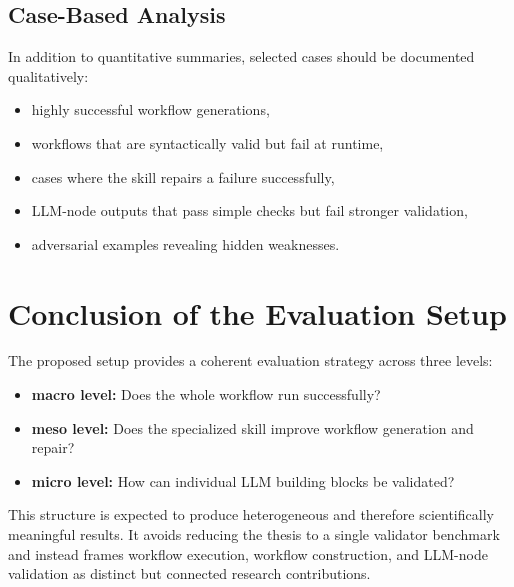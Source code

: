 \documentclass[12pt,a4paper]{article}
\begin{document}
\subsection{Case-Based Analysis}

In addition to quantitative summaries, selected cases should be documented qualitatively:

\begin{itemize}
  \item highly successful workflow generations,
  \item workflows that are syntactically valid but fail at runtime,
  \item cases where the skill repairs a failure successfully,
  \item LLM-node outputs that pass simple checks but fail stronger validation,
  \item adversarial examples revealing hidden weaknesses.
\end{itemize}

\section{Conclusion of the Evaluation Setup}

The proposed setup provides a coherent evaluation strategy across three levels:

\begin{itemize}
  \item \textbf{macro level:} Does the whole workflow run successfully?
  \item \textbf{meso level:} Does the specialized skill improve workflow generation and repair?
  \item \textbf{micro level:} How can individual LLM building blocks be validated?
\end{itemize}

This structure is expected to produce heterogeneous and therefore scientifically meaningful results. It avoids reducing the thesis to a single validator benchmark and instead frames workflow execution, workflow construction, and LLM-node validation as distinct but connected research contributions.
\end{document}
